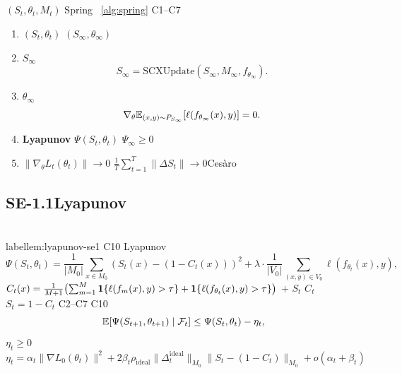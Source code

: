 \subsection{}

\begin{theorem}[Spring-1 ()]\label{thm:spring1}
 $(S_t, \theta_t, M_t)$  Spring ~\ref{alg:spring} C1--C7 
\begin{enumerate}[label=(\alph*), nosep]
    \item \textbf{} $(S_t, \theta_t)$  $(S_\infty, \theta_\infty)$
    \item \textbf{}$S_\infty$ 
    \begin{equation}
        S_\infty = \text{SCXUpdate}(S_\infty, M_\infty, f_{\theta_\infty}).
    \end{equation}
    \item \textbf{}$\theta_\infty$ 
    \begin{equation}
        \nabla_\theta \mathbb{E}_{(x,y) \sim P_{S_\infty}}[\ell(f_{\theta_\infty}(x), y)] = 0.
    \end{equation}
    \item \textbf{Lyapunov } $\Psi(S_t, \theta_t)$  $\Psi_\infty \geq 0$
    \item \textbf{}$\|\nabla_\theta L_t(\theta_t)\| \to 0$ $\frac{1}{T}\sum_{t=1}^{T}\|\Delta S_t\| \to 0$Ces\`{a}ro 
\end{enumerate}
\end{theorem}

\subsection{ SE-1.1Lyapunov }

\begin{lemma}[Lyapunov  — ]\\label{lem:lyapunov-se1}
 C10 Lyapunov \textbf{}
\begin{equation}\label{eq:lyapunov-def}
    \Psi(S_t, \theta_t) = \frac{1}{|M_0|} \sum_{x \in M_0} (S_t(x) - (1 - C_t(x)))^2 + \lambda \cdot \frac{1}{|V_0|} \sum_{(x,y) \in V_0} \ell(f_{\theta_t}(x), y),
\end{equation}
 $C_t(x) = \frac{1}{M+1}\bigl(\sum_{m=1}^M \mathbf{1}\{\ell(f_m(x), y) > \tau\} + \mathbf{1}\{\ell(f_{\theta_t}(x), y) > \tau\}\bigr)$ \textbf{} + 
 $S_t$  $C_t$ $S_t = 1 - C_t$ C2--C7  C10 
\begin{equation}\label{eq:descent-se1}
    \mathbb{E}[\Psi(S_{t+1}, \theta_{t+1}) \mid \mathcal{F}_t] \leq \Psi(S_t, \theta_t) - \eta_t,
\end{equation}
 $\eta_t \geq 0$  $\eta_t = \alpha_t \|\nabla L_0(\theta_t)\|^2 + 2\beta_t \rho_{\text{ideal}} \|\Delta_t^{\text{ideal}}\|_{M_0} \|S_t - (1-C_t)\|_{M_0} + o(\alpha_t + \beta_t)$
\end{lemma}

